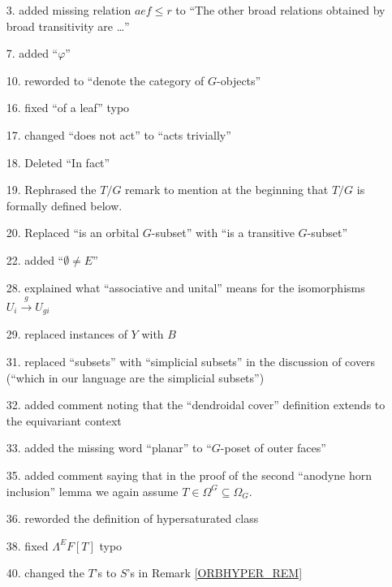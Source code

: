 \documentclass{article}
\begin{document}

\begin{itemize}
\item[3.] added missing relation $aef \leq r$ to ``The other broad relations obtained by broad transitivity are \dots''
\item[7.] added ``$\varphi$''
\item[10.] reworded to ``denote the category of $G$-objects''
\item[16.] fixed ``of a leaf'' typo
\item[17.] changed ``does not act'' to ``acts trivially''
\item[18.] Deleted ``In fact''
\item[19.] Rephrased the $T/G$ remark to mention at the beginning that $T/G$ is formally defined below.
\item[20.] Replaced ``is an orbital $G$-subset'' with ``is a transitive $G$-subset''
\item[22.] added ``$\emptyset \neq E$''
\item[28.] explained what ``associative and unital'' means for the isomorphisms $U_i \xrightarrow{g} U_{gi}$
\item[29.] replaced instances of $Y$ with $B$
\item[31.] replaced ``subsets'' with ``simplicial subsets'' in the discussion of covers (``which in our language are the simplicial subsets'')
\item[32.] added comment noting that the ``dendroidal cover'' definition extends to the equivariant context
\item[33.] added the missing word ``planar'' to ``$G$-poset of outer faces''
\item[35.] added comment saying that in the proof of the second ``anodyne horn inclusion'' lemma we again assume $T \in \Omega^G \subseteq \Omega_G$.
\item[36.] reworded the definition of hypersaturated class
\item[38.] fixed $\Lambda^EF[T]$ typo
\item[40.] changed the $T$'s to $S$'s in Remark \ref{ORBHYPER_REM} %

\end{itemize}
\end{document}
